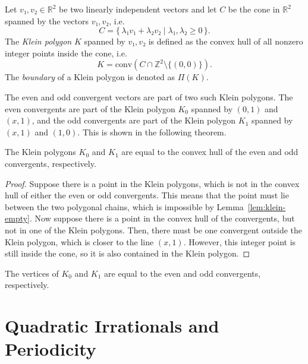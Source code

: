 \begin{definition}
  \label{def:klein-polygon}
  Let $v₁, v₂ ∈ ℝ^2$ be two linearly independent vectors
  and let $C$ be the cone in $ℝ^2$ spanned by the vectors $v₁, v₂$, i.e.
  \[
    C = \{\, λ₁ v₁ + λ₂ v₂ \mid λ₁, λ₂ ≥ 0 \,\}.
  \]
  The \emph{Klein polygon} $K$ spanned by $v₁, v₂$ is defined as the convex hull
  of all nonzero integer points inside the cone, i.e.
  \[
    K = \mathrm{conv}(C ∩ ℤ^2 \setminus \{(0, 0)\}).
  \]
  The \emph{boundary} of a Klein polygon is denoted as $Π(K)$.
\end{definition}

The even and odd convergent vectors are part of two such Klein polygons.
The even convergents are part of the Klein polygon $K_0$ spanned by $(0, 1)$ and $(x, 1)$,
and the odd convergents are part of the Klein polygon $K_1$ spanned by $(x, 1)$ and $(1, 0)$.
This is shown in the following theorem.

\begin{theorem}
  The Klein polygons $K_0$ and $K_1$ are equal to the
  convex hull of the even and odd convergents, respectively.
\end{theorem}

\begin{proof}
  Suppose there is a point in the Klein polygons,
  which is not in the convex hull of either the even or odd convergents.
  This means that the point must lie between the two polygonal chains,
  which is impossible by Lemma~\ref{lem:klein-empty}.
  Now suppose there is a point in the convex hull of the convergents,
  but not in one of the Klein polygons.
  Then, there must be one convergent outside the Klein polygon,
  which is closer to the line $(x, 1)$.
  However, this integer point is still inside the cone,
  so it is also contained in the Klein polygon.
\end{proof}

\begin{corollary}
  The vertices of $K_0$ and $K_1$ are equal to the
  even and odd convergents, respectively.
\end{corollary}

\section{Quadratic Irrationals and Periodicity}
\label{sec:cf-quadratic}

